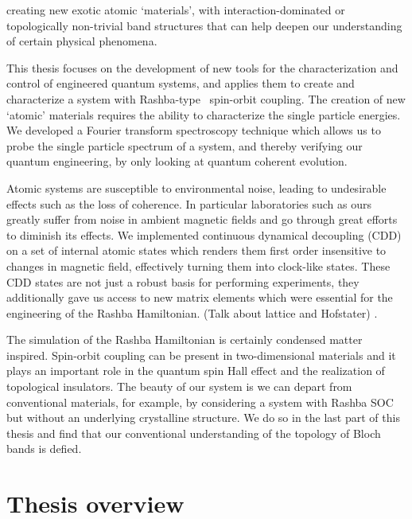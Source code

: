  creating new exotic atomic `materials', with interaction-dominated or topologically non-trivial band structures that can help deepen our understanding of certain physical phenomena. 



 

This thesis focuses on the development of new tools for the characterization and control of engineered quantum systems, and applies them to create and characterize a system with Rashba-type~\cite{bychkov_oscillatory_1984} spin-orbit coupling. The creation of new `atomic' materials requires the ability to characterize the single particle energies. We developed a  Fourier transform spectroscopy technique which allows us to probe the single particle spectrum of a system, and thereby verifying our quantum engineering, by only looking at quantum coherent evolution. 

Atomic systems are susceptible to environmental noise, leading to undesirable effects such as the loss of coherence. In particular laboratories such as ours greatly suffer from noise in ambient magnetic fields and go through great efforts to diminish its effects. We implemented continuous dynamical decoupling (CDD) on a set of internal atomic states which renders them first order insensitive to changes in magnetic field, effectively turning them into clock-like states. These CDD states are not just a robust basis for performing experiments, they additionally gave us access to new matrix elements which were essential for the engineering of the Rashba Hamiltonian. (Talk about lattice and Hofstater) . 

The simulation of the Rashba Hamiltonian is certainly condensed matter inspired. Spin-orbit coupling can be present in two-dimensional materials and it plays an important role in the quantum spin Hall effect and the realization of topological insulators. The beauty of our system is we can depart from conventional materials, for example, by considering a system with Rashba SOC but without an underlying crystalline structure. We do so in the last part of this thesis and find that our conventional understanding of the topology of Bloch bands is defied. 


\section{Thesis overview}


